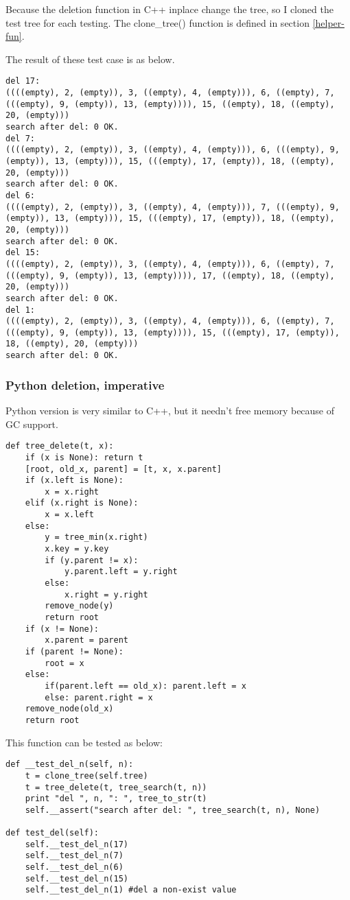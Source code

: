 \documentclass{article}
\begin{document}
Because the deletion function in C++ inplace change the tree, so I cloned the test 
tree for each testing. The clone\_tree() function is defined in section \ref{helper-fun}.

The result of these test case is as below.
\begin{verbatim}
del 17:
((((empty), 2, (empty)), 3, ((empty), 4, (empty))), 6, ((empty), 7, 
(((empty), 9, (empty)), 13, (empty)))), 15, ((empty), 18, ((empty), 
20, (empty)))
search after del: 0 OK.
del 7:
((((empty), 2, (empty)), 3, ((empty), 4, (empty))), 6, (((empty), 9, 
(empty)), 13, (empty))), 15, (((empty), 17, (empty)), 18, ((empty), 
20, (empty)))
search after del: 0 OK.
del 6:
((((empty), 2, (empty)), 3, ((empty), 4, (empty))), 7, (((empty), 9, 
(empty)), 13, (empty))), 15, (((empty), 17, (empty)), 18, ((empty), 
20, (empty)))
search after del: 0 OK.
del 15:
((((empty), 2, (empty)), 3, ((empty), 4, (empty))), 6, ((empty), 7, 
(((empty), 9, (empty)), 13, (empty)))), 17, ((empty), 18, ((empty), 
20, (empty)))
search after del: 0 OK.
del 1:
((((empty), 2, (empty)), 3, ((empty), 4, (empty))), 6, ((empty), 7, 
(((empty), 9, (empty)), 13, (empty)))), 15, (((empty), 17, (empty)), 
18, ((empty), 20, (empty)))
search after del: 0 OK.
\end{verbatim}

\subsubsection*{Python deletion, imperative}
Python version is very similar to C++, but it needn't free memory because
of GC support.

\lstset{language=Python}
\begin{lstlisting}
def tree_delete(t, x):
    if (x is None): return t
    [root, old_x, parent] = [t, x, x.parent]
    if (x.left is None):
        x = x.right
    elif (x.right is None):
        x = x.left
    else:
        y = tree_min(x.right)
        x.key = y.key
        if (y.parent != x):
            y.parent.left = y.right
        else:
            x.right = y.right
        remove_node(y)
        return root
    if (x != None):
        x.parent = parent
    if (parent != None):
        root = x
    else:
        if(parent.left == old_x): parent.left = x
        else: parent.right = x
    remove_node(old_x)
    return root
\end{lstlisting}

This function can be tested as below:

\begin{lstlisting}
def __test_del_n(self, n):
    t = clone_tree(self.tree)
    t = tree_delete(t, tree_search(t, n))
    print "del ", n, ": ", tree_to_str(t)
    self.__assert("search after del: ", tree_search(t, n), None)

def test_del(self):
    self.__test_del_n(17)
    self.__test_del_n(7)
    self.__test_del_n(6)
    self.__test_del_n(15)
    self.__test_del_n(1) #del a non-exist value
\end{lstlisting}
\end{document}
